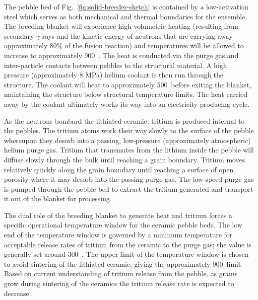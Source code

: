 The pebble bed of Fig.~\ref{fig:solid-breeder-sketch} is contained by a low-activation steel which serves as both mechanical and thermal boundaries for the ensemble. The breeding blanket will experience high volumetric heating (resulting from secondary $\gamma$ rays and the kinetic energy of neutrons that are carrying away approximately 80\% of the fusion reaction) and temperatures will be allowed to increase to approximately 900~\celsius. The heat is conducted via the purge gas and inter-particle contacts between pebbles to the structural material. A high pressure (approximately 8 MPa) helium coolant is then run through the structure. The coolant will heat to approximately 500~\celsius before exiting the blanket, maintaining the structure below structural temperature limits. The heat carried away by the coolant ultimately works its way into an electricity-producing cycle. 

As the neutrons bombard the lithiated ceramic, tritium is produced internal to the pebbles. The tritium atoms work their way slowly to the surface of the pebble whereupon they desorb into a passing, low-pressure (approximately atmospheric) helium purge gas. Tritium that transmutes from the lithium inside the pebble will diffuse slowly through the bulk until reaching a grain boundary. Tritium moves relatively quickly along the grain boundary until reaching a surface of open porosity where it may desorb into the passing purge gas.\cite{Federici1990} The low-speed purge gas is pumped through the pebble bed to extract the tritium generated and transport it out of the blanket for processing. 

The dual role of the breeding blanket to generate heat and tritium forces a specific operational temperature window for the ceramic pebble beds. The low end of the temperature window is governed by a minimum temperature for acceptable release rates of tritium from the ceramic to the purge gas; the value is generally set around 300~\celsius. The upper limit of the temperature window is chosen to avoid sintering of the lithiated ceramic, giving the approximately 900~\celsius limit. Based on current understanding of tritium release from the pebble, as grains grow during sintering of the ceramics the tritium release rate is expected to decrease.

